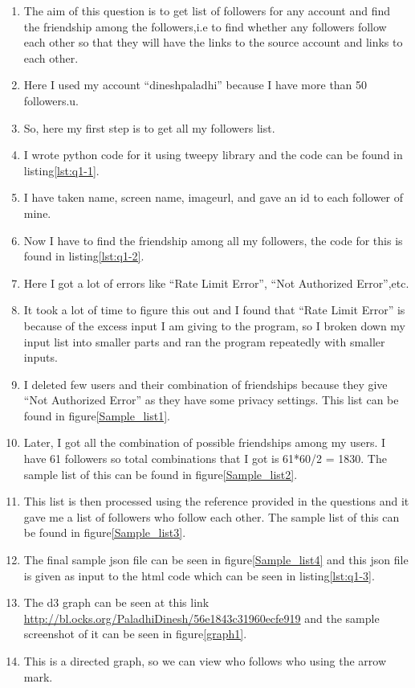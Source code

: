 \begin{enumerate}
\item The aim of this question is to get list of followers for any account and find the friendship among the followers,i.e to find whether any followers follow each other so that they will have the links to the source account and links to each other.
\item Here I used my account ``dineshpaladhi'' because I have more than 50 followers.u.
\item So, here my first step is to get all my followers list.
\item I wrote python code for it using tweepy library and the code can be found in listing\ref{lst:q1-1}.
\item I have taken name, screen name, imageurl, and gave an id to each follower of mine. 
\item Now I have to find the friendship among all my followers, the code for this is found in listing\ref{lst:q1-2}.
\item Here I got a lot of errors like ``Rate Limit Error'', ``Not Authorized Error'',etc.
\item It took a lot of time to figure this out and I found that ``Rate Limit Error'' is because of the excess input I am giving to the program, so I broken down my input list into smaller parts and ran the program repeatedly with smaller inputs.
\item I deleted few users and their combination of friendships because they give ``Not Authorized Error'' as they have some privacy settings. This list can be found in figure\ref{Sample_list1}.
\item Later, I got all the combination of possible friendships among my users. I have 61 followers so total combinations that I got is 61*60/2 = 1830. The sample list of this can be found in figure\ref{Sample_list2}.
\item This list is then processed using the reference provided in the questions and it gave me a list of followers who follow each other. The sample list of this can be found in figure\ref{Sample_list3}.
\item The final sample json file can be seen in figure\ref{Sample_list4} and this json file is given as input to the html code which can be seen in listing\ref{lst:q1-3}.
\item The d3 graph can be seen at this link \url{http://bl.ocks.org/PaladhiDinesh/56e1843c31960ecfe919} and the sample screenshot of it can be seen in figure\ref{graph1}.
\item This is a directed graph, so we can view who follows who using the arrow mark.

\end{enumerate}

